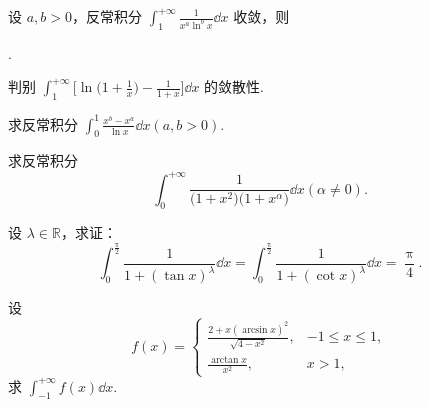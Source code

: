 	\begin{ti}
		设 $a, b > 0$，反常积分 $\int_{1}^{+\infty} \frac{1}{x^{a} \ln^{b}x} \dd{x}$ 收敛，则
		
		\noindent\kuo.

	\end{ti}

	\begin{ti}
		判别 $\int_{1}^{+\infty} \bigl[ \ln \bigl( 1 + \frac{1}{x} \bigr) - \frac{1}{1 + x} \bigr] \dd{x}$ 的敛散性.
	\end{ti}

	\begin{ti}
		求反常积分 $\int_{0}^{1} \frac{x^{b} - x^{a}}{\ln x} \dd{x} (a,b > 0)$.
	\end{ti}

	\begin{ti}
		求反常积分
		\[
			\int_{0}^{+\infty} \frac{1}{ \bigl(1 + x^{2}\bigr) \bigl(1 + x^{\alpha}\bigr) } \dd{x} (\alpha \ne 0).
		\]
	\end{ti}

	\begin{ti}
		设 $\lambda \in \mathbb{R}$，求证：
		\[
			\int_{0}^{\frac{\uppi}{2}} \frac{1}{1 + (\tan x)^{\lambda}} \dd{x} = \int_{0}^{\frac{\uppi}{2}} \frac{1}{1 + (\cot x)^{\lambda}} \dd{x} = \frac{\uppi}{4}.
		\]
	\end{ti}

	\begin{ti}
		设
		\[
			f(x) = \begin{cases}
				\frac{ 2 + x (\arcsin x)^{2} }{\sqrt{4 - x^{2}}}, & -1 \leq x \leq 1,\\
				\frac{\arctan x}{x^{2}}, & x > 1,
			\end{cases}
		\]
		求 $\int_{-1}^{+\infty} f(x) \dd{x}$.
	\end{ti}